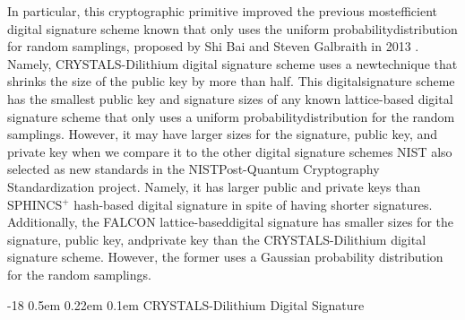 \documentclass[runningheads]{llncs}
\makeatletter
\renewcommand\subsubsection{\@startsection{subsubsection}{3}{\z@}%
                       {-18\p@ \@plus -4\p@ \@minus -4\p@}%
                       {0.5em \@plus 0.22em \@minus 0.1em}%
                       {\normalfont\normalsize\bfseries\boldmath}}
\numberwithin{equation}{section}
\makeatother
\begin{document}
    In particular, this cryptographic primitive improved the previous most\break efficient digital signature scheme known that only uses the uniform probability\break distribution for random samplings, proposed by Shi Bai and Steven Galbraith in 2013 \cite{bai-galbraith:improved-compression-technique-signatures-based-learning-with-errors:2013:06-2024}. Namely, CRYSTALS-Dilithium digital signature scheme uses a new\break technique that shrinks the size of the public key by more than half. This digital\break signature scheme has the smallest public key and signature sizes of any known lattice-based digital signature scheme that only uses a uniform probability\break distribution for the random samplings. However, it may have larger sizes for the signature, public key, and private key when we compare it to the other digital signature schemes NIST also selected as new standards in the NIST\break Post-Quantum Cryptography Standardization project. Namely, it has larger public and private keys than SPHINCS${}^{+}$ hash-based digital signature \cite{bernstein-et-al:sphincs-practical-stateless-hash-based-signatures:2015:06-2024,bernstein-et-al:sphincs+-signature-framework:2019:06-2024}\break in spite of having shorter signatures. Additionally, the FALCON lattice-based\break digital signature \cite{gentry-peikert-vaikuntanathan:trapdoors-hard-lattices-and-new-cryptographic-constructions:2007:06-2024,fouque-et-al:falcon-fast-fourier-lattice-based-compact-signatures-over-ntru:2019:06-2024} has smaller sizes for the signature, public key, and\break private key than the CRYSTALS-Dilithium digital signature scheme. However, the former uses a Gaussian probability distribution for the random samplings.


    \subsubsection{CRYSTALS-Dilithium Digital Signature}
    \label{subsubsec:crystals-dilithium-digital-signature}
\end{document}

